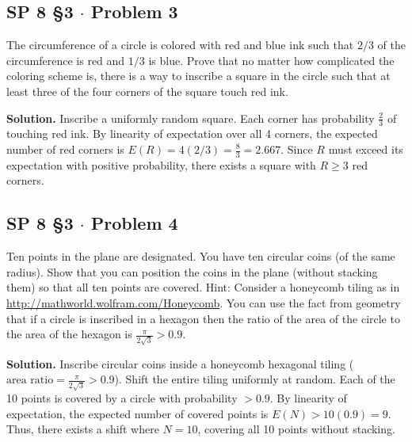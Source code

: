 \documentclass[11pt,a4paper]{article}
\begin{document}
\vspace{10pt}
\subsection{SP 8 \S3 $\cdot$ Problem 3}
\begin{tcolorbox}[title={SP 8 \S3 $\cdot$ Problem 3}]
The circumference of a circle is colored with red and blue ink such that $2/3$ of the circumference is red and $1/3$ is blue. Prove that no matter how complicated the coloring scheme is, there is a way to inscribe a square in the circle such that at least three of the four corners of the square touch red ink.
\end{tcolorbox}

\noindent \textbf{Solution.} Inscribe a uniformly random square. Each corner has probability $\frac{2}{3}$ of touching red ink. By linearity of expectation over all 4 corners, the expected number of red corners is $E(R) = 4(2/3) = \frac{8}{3} = 2.667$. Since $R$ must exceed its expectation with positive probability, there exists a square with $R \ge 3$ red corners.

\vspace{10pt}
\subsection{SP 8 \S3 $\cdot$ Problem 4}
\begin{tcolorbox}[title={SP 8 \S3 $\cdot$ Problem 4}]
Ten points in the plane are designated. You have ten circular coins (of the same radius). Show that you can position the coins in the plane (without stacking them) so that all ten points are covered.
Hint: Consider a honeycomb tiling as in \url{http://mathworld.wolfram.com/Honeycomb}. You can use the fact from geometry that if a circle is inscribed in a hexagon then the ratio of the area of the circle to the area of the hexagon is $\frac{\pi}{2\sqrt{3}} > 0.9$.
\end{tcolorbox}

\noindent \textbf{Solution.} Inscribe circular coins inside a honeycomb hexagonal tiling ($\text{area ratio} = \frac{\pi}{2\sqrt{3}} > 0.9$). Shift the entire tiling uniformly at random. Each of the 10 points is covered by a circle with probability $>0.9$. By linearity of expectation, the expected number of covered points is $E(N) > 10(0.9) = 9$. Thus, there exists a shift where $N = 10$, covering all 10 points without stacking.

\vspace{15pt}
\end{document}

